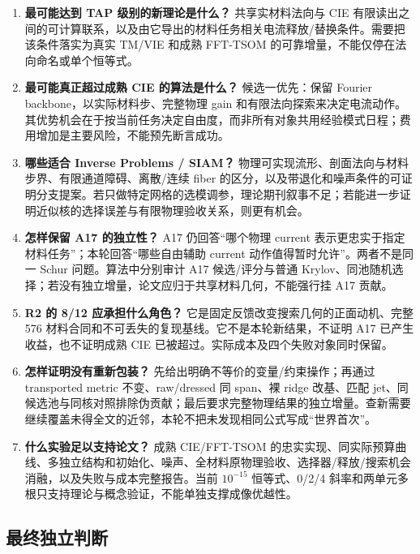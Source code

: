 \documentclass[10pt,a4paper]{article}
\begin{document}
\begin{enumerate}
\def\labelenumi{\arabic{enumi}.}
\item
  \textbf{最可能达到 TAP 级别的新理论是什么？} 共享实材料法向与 CIE
  有限读出之间的可计算联系，以及由它导出的材料任务相关电流释放/替换条件。需要把该条件落实为真实
  TM/VIE 和成熟 FFT-TSOM 的可靠增量，不能仅停在法向命名或单个恒等式。
\item
  \textbf{最可能真正超过成熟 CIE 的算法是什么？} 候选一优先：保留
  Fourier backbone，以实际材料步、完整物理 gain
  和有限法向探索来决定电流动作。其优势机会在于按当前任务决定自由度，而非所有对象共用经验模式日程；费用增加是主要风险，不能预先断言成功。
\item
  \textbf{哪些适合 Inverse Problems / SIAM？}
  物理可实现流形、剖面法向与材料步界、有限通道障碍、离散/连续 fiber
  的区分，以及带退化和噪声条件的可证明分支提案。若只做特定网格的选模调参，理论期刊叙事不足；若能进一步证明近似核的选择误差与有限物理验收关系，则更有机会。
\item
  \textbf{怎样保留 A17 的独立性？} A17 仍回答``哪个物理 current
  表示更忠实于指定材料任务''；本轮回答``哪些自由辅助 current
  动作值得暂时允许''。两者不是同一 Schur 问题。算法中分别审计 A17
  候选/评分与普通
  Krylov、同池随机选择；若没有独立增量，论文应归于共享材料几何，不能强行挂
  A17 贡献。
\item
  \textbf{R2 的 8/12 应承担什么角色？}
  它是固定反馈改变搜索几何的正面动机、完整 576
  材料合同和不可丢失的复现基线。它不是本轮新结果，不证明 A17
  已产生收益，也不证明成熟 CIE
  已被超过。实际成本及四个失败对象同时保留。
\item
  \textbf{怎样证明没有重新包装？}
  先给出明确不等价的变量/约束操作；再通过 transported metric
  不变、raw/dressed 同 span、裸 ridge 改基、匹配
  jet、同候选池与同核对照排除伪贡献；最后要求完整物理结果的独立增量。查新需要继续覆盖未得全文的近邻，本轮不把未发现相同公式写成``世界首次''。
\item
  \textbf{什么实验足以支持论文？} 成熟 CIE/FFT-TSOM
  的忠实实现、同实际预算曲线、多独立结构和初始化、噪声、全材料原物理验收、选择器/释放/搜索机会消融，以及失败与成本完整报告。当前
  \(10^{-15}\) 恒等式、0/2/4
  斜率和两单元多根只支持理论与概念验证，不能单独支撑成像优越性。
\end{enumerate}

\hypertarget{ux6700ux7ec8ux72ecux7acbux5224ux65ad}{%
\subsection{最终独立判断}\label{ux6700ux7ec8ux72ecux7acbux5224ux65ad}}
\end{document}
